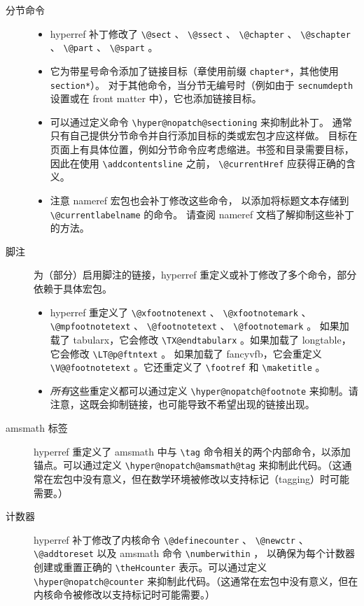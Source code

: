 \documentclass{article}
\newcommand*{\cs}[1]{%
  \texttt{\textbackslash #1}%
}
\newcommand*{\xpackage}[1]{\textsf{#1}}
\begin{document}
\begin{description}
\item[分节命令]
\begin{itemize}
\item \xpackage{hyperref} 补丁修改了 \cs{@sect}、\cs{@ssect}、\cs{@chapter}、\cs{@schapter}、
\cs{@part}、\cs{@spart}。

\item 它为带星号命令添加了链接目标（章使用前缀 \texttt{chapter*}，其他使用 \texttt{section*}）。
对于其他命令，当分节无编号时（例如由于 \texttt{secnumdepth} 设置或在 front matter 中），它也添加链接目标。

\item 可以通过定义命令 \cs{hyper@nopatch@sectioning} 来抑制此补丁。
通常只有自己提供分节命令并自行添加目标的类或宏包才应这样做。
目标在页面上有具体位置，例如分节命令应考虑缩进。书签和目录需要目标，
因此在使用 \cs{addcontentsline} 之前，\cs{@currentHref} 应获得正确的含义。

\item 注意 \xpackage{nameref} 宏包也会补丁修改这些命令，
以添加将标题文本存储到 \cs{@currentlabelname} 的命令。
请查阅 \xpackage{nameref} 文档了解抑制这些补丁的方法。
\end{itemize}

\item[脚注] 为（部分）启用脚注的链接，\xpackage{hyperref} 重定义或补丁修改了多个命令，部分依赖于具体宏包。
\begin{itemize}
\item \xpackage{hyperref} 重定义了 \cs{@xfootnotenext}、\cs{@xfootnotemark}、\cs{@mpfootnotetext}、
    \cs{@footnotetext}、\cs{@footnotemark}。
    如果加载了 \xpackage{tabularx}，它会修改 \cs{TX@endtabularx}。如果加载了 \xpackage{longtable}，它会修改 \cs{LT@p@ftntext}。
    如果加载了 \xpackage{fancyvfb}，它会重定义 \cs{V@@footnotetext}。它还重定义了 \cs{footref} 和 \cs{maketitle}。

\item \emph{所有}这些重定义都可以通过定义 \cs{hyper@nopatch@footnote} 来抑制。请注意，这既会抑制链接，也可能导致不希望出现的链接出现。
\end{itemize}

\item[amsmath 标签] \xpackage{hyperref} 重定义了 amsmath 中与 \cs{tag} 命令相关的两个内部命令，以添加锚点。可以通过定义 \cs{hyper@nopatch@amsmath@tag} 来抑制此代码。（这通常在宏包中没有意义，但在数学环境被修改以支持标记（tagging）时可能需要。）

\item[计数器] \xpackage{hyperref} 补丁修改了内核命令 \cs{@definecounter}、
    \cs{@newctr}、\cs{@addtoreset} 以及 amsmath 命令 \cs{numberwithin}，
    以确保为每个计数器创建或重置正确的 \cs{theHcounter} 表示。可以通过定义 \cs{hyper@nopatch@counter} 来抑制此代码。（这通常在宏包中没有意义，但在内核命令被修改以支持标记时可能需要。）


\end{description}
\end{document}

